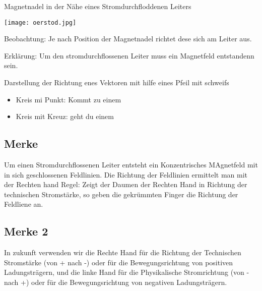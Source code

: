 \documentclass{article}
\begin{document}
Magnetnadel in der Nähe eines Stromdurchfloddenen Leiters

\texttt{[image: oerstod.jpg]}

\noindent Beobachtung: Je nach Position der Magnetnadel richtet dese sich am Leiter aus.

\noindent Erklärung: Um den stromdurchflossenen Leiter muss ein Magnetfeld entstandenn sein.

Darstellung der Richtung enes Vektoren mit hilfe eines Pfeil mit schweifs

\begin{itemize}
\item Kreis mi Punkt: Kommt zu einem
\item Kreis mit Kreuz: geht du einem
\end{itemize}

\subsection*{Merke}

Um einen Stromdurchflossenen Leiter entsteht ein Konzentrisches MAgnetfeld mit in sich geschlossenen Feldlinien.
Die Richtung der Feldlinien ermittelt man mit der Rechten hand Regel: Zeigt der Daumen der Rechten Hand in Richtung der technischen Stromstärke, so geben die gekrümmten Finger die Richtung der Feldliene an.

\subsection*{Merke 2}

In zukunft verwenden wir die Rechte Hand für die Richtung der Technischen Stromstärke (von + nach -) oder für die Bewegungsrichtung von positiven Ladungsträgern, und die linke Hand für die Physikalische Stromrichtung (von - nach +) oder für die Bewegungsrichtung von negativen Ladungsträgern.
\end{document}
